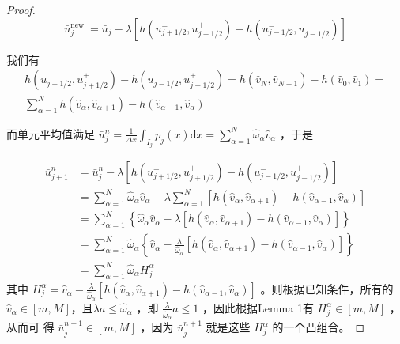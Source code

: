 \documentclass{article}
\numberwithin{equation}{subsection}    %
\begin{document}
\begin{proof}
    \begin{equation}
        \bar{u}_{j}^{\text {new }}=\bar{u}_{j}-\lambda\left[h\left(u_{j+1 / 2}^{-}, u_{j+1 / 2}^{+}\right)-h\left(u_{j-1 / 2}^{-}, u_{j-1 / 2}^{+}\right)\right]
    \end{equation}

    我们有
    \begin{equation}
        \begin{array}{l}
            h\left(u_{j+1 / 2}^{-}, u_{j+1 / 2}^{+}\right)-h\left(u_{j-1 / 2}^{-}, u_{j-1 / 2}^{+}\right)=h\left(\hat{v}_{N}, \hat{v}_{N+1}\right)-h\left(\hat{v}_{0}, \hat{v}_{1}\right)= \\
            \sum_{\alpha=1}^{N} h\left(\hat{v}_{\alpha}, \hat{v}_{\alpha+1}\right)-h\left(\hat{v}_{\alpha-1}, \hat{v}_{\alpha}\right)
        \end{array}
    \end{equation}



    而单元平均值满足  $\bar{u}_{j}^{n}=\frac{1}{\Delta x} \int_{I_{j}} p_{j}(x) \mathrm{d} x=\sum_{\alpha=1}^{N} \hat{\omega}_{\alpha} \hat{v}_{\alpha}$  ，于是

    \begin{equation}
        \begin{aligned}
            \bar{u}_{j+1}^{n} & =\bar{u}_{j}^{n}-\lambda\left[h\left(u_{j+1 / 2}^{-}, u_{j+1 / 2}^{+}\right)-h\left(u_{j-1 / 2}^{-}, u_{j-1 / 2}^{+}\right)\right]                                                                                                \\
                              & =\sum_{\alpha=1}^{N} \hat{\omega}_{\alpha} \hat{v}_{\alpha}-\lambda \sum_{\alpha=1}^{N}\left[h\left(\hat{v}_{\alpha}, \hat{v}_{\alpha+1}\right)-h\left(\hat{v}_{\alpha-1}, \hat{v}_{\alpha}\right)\right]                         \\
                              & =\sum_{\alpha=1}^{N}\left\{\hat{\omega}_{\alpha} \hat{v}_{\alpha}-\lambda\left[h\left(\hat{v}_{\alpha}, \hat{v}_{\alpha+1}\right)-h\left(\hat{v}_{\alpha-1}, \hat{v}_{\alpha}\right)\right]\right\}                               \\
                              & =\sum_{\alpha=1}^{N} \hat{\omega}_{\alpha}\left\{\hat{v}_{\alpha}-\frac{\lambda}{\hat{\omega}_{\alpha}}\left[h\left(\hat{v}_{\alpha}, \hat{v}_{\alpha+1}\right)-h\left(\hat{v}_{\alpha-1}, \hat{v}_{\alpha}\right)\right]\right\}\\
                              & =\sum_{\alpha=1}^{N} \hat{\omega}_{\alpha} H_{j}^{\alpha}
        \end{aligned}
    \end{equation}
    其中  $H_{j}^{\alpha}=\hat{v}_{\alpha}-\frac{\lambda}{\hat{\omega}_{\alpha}}\left[h\left(\hat{v}_{\alpha}, \hat{v}_{\alpha+1}\right)-h\left(\hat{v}_{\alpha-1}, \hat{v}_{\alpha}\right)\right]$  。则根据已知条件，所有的 $\hat{v}_{\alpha} \in[m, M]  ，且  \lambda a \leq \hat{\omega}_{\alpha} $ ，即 $\frac{\lambda}{\hat{\omega}_{\alpha}} a \leq 1$  ，因此根据Lemma 1有 $H_{j}^{\alpha} \in[m, M]$ ，从而可 得  $\bar{u}_{j}^{n+1} \in[m, M]$  ，因为  $\bar{u}_{j}^{n+1}$  就是这些  $H_{j}^{\alpha}$ 的一个凸组合。
\end{proof}
\end{document}

